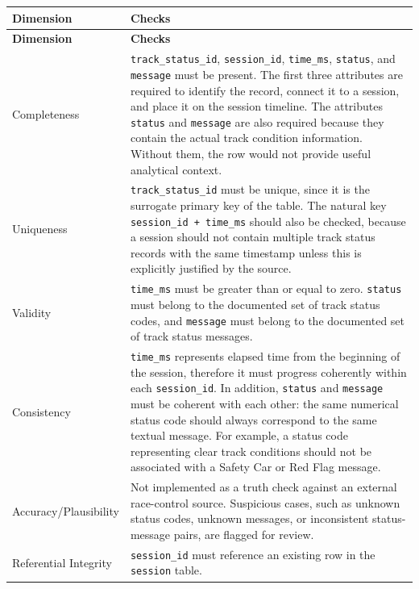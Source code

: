 \documentclass[a4paper,11pt]{article}
\begin{document}
	\begin{longtable}{p{3.5cm}p{11cm}}
		\toprule
		\textbf{Dimension} & \textbf{Checks} \\
		\midrule
		\endfirsthead
		
		\toprule
		\textbf{Dimension} & \textbf{Checks} \\
		\midrule
		\endhead
		
		Completeness
		& \texttt{track\_status\_id}, \texttt{session\_id}, \texttt{time\_ms},
		\texttt{status}, and \texttt{message} must be present. The first three
		attributes are required to identify the record, connect it to a session, and
		place it on the session timeline. The attributes \texttt{status} and
		\texttt{message} are also required because they contain the actual track
		condition information. Without them, the row would not provide useful
		analytical context. \\
		\midrule
		
		Uniqueness
		& \texttt{track\_status\_id} must be unique, since it is the surrogate
		primary key of the table. The natural key \texttt{session\_id + time\_ms}
		should also be checked, because a session should not contain multiple track
		status records with the same timestamp unless this is explicitly justified
		by the source. \\
		\midrule
		
		Validity
		& \texttt{time\_ms} must be greater than or equal to zero.
		\texttt{status} must belong to the documented set of track status codes,
		and \texttt{message} must belong to the documented set of track status
		messages. \\
		\midrule
		
		Consistency
		& \texttt{time\_ms} represents elapsed time from the beginning of the
		session, therefore it must progress coherently within each
		\texttt{session\_id}. In addition, \texttt{status} and \texttt{message}
		must be coherent with each other: the same numerical status code should
		always correspond to the same textual message. For example, a status code
		representing clear track conditions should not be associated with a Safety
		Car or Red Flag message. \\
		\midrule
		
		Accuracy/Plausibility
		& Not implemented as a truth check against an external race-control source. Suspicious cases, such as unknown status
		codes, unknown messages, or inconsistent status-message pairs, are flagged
		for review. \\
		\midrule
		
		Referential Integrity
		& \texttt{session\_id} must reference an existing row in the
		\texttt{session} table. \\
		\bottomrule
	\end{longtable}
	
\end{document}
